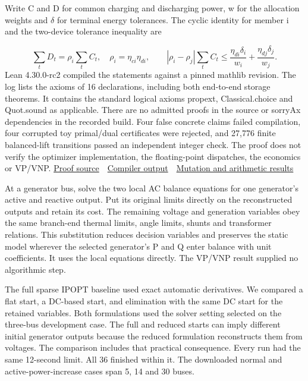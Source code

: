 \documentclass[11pt,letterpaper]{article}
\newcommand{\secname}[1]{\vspace*{2pt}{\LARGE\bfseries\color{accent}#1\par}\vspace{5pt}}
\begin{document}
Write C and D for common charging and discharging power, w for the allocation weights and \ensuremath{\delta} for terminal energy tolerances. The cyclic identity for member i and the two-device tolerance inequality are\par
\[\sum_t D_t=\rho_i\sum_t C_t,\quad \rho_i=\eta_{ci}\eta_{di},\qquad |\rho_i-\rho_j|\sum_t C_t\leq \frac{\eta_{di}\delta_i}{w_i}+\frac{\eta_{dj}\delta_j}{w_j}.\]
Lean 4.30.0-rc2 compiled the statements against a pinned mathlib revision. The log lists the axioms of 16 declarations, including both end-to-end storage theorems. It contains the standard logical axioms propext, Classical.choice and Quot.sound as applicable. There are no admitted proofs in the source or sorryAx dependencies in the recorded build. Four false concrete claims failed compilation, four corrupted toy primal/dual certificates were rejected, and 27,776 finite balanced-lift transitions passed an independent integer check. The proof does not verify the optimizer implementation, the floating-point dispatches, the economics or VP/VNP. \href{https://github.com/nousentllc/VP-VNP-Review/blob/energy-explorations/energy/W03/formal/Storage.lean}{Proof source} \,\textperiodcentered\, \href{https://github.com/nousentllc/VP-VNP-Review/blob/energy-explorations/energy/W03/results/B/lean-build.log}{Compiler output} \,\textperiodcentered\, \href{https://github.com/nousentllc/VP-VNP-Review/blob/energy-explorations/energy/W03/results/B/checks.json}{Mutation and arithmetic results}\par
\clearpage
\secname{W03-C \,\textperiodcentered\, Exact elimination in AC power flow}
At a generator bus, solve the two local AC balance equations for one generator's active and reactive output. Put its original limits directly on the reconstructed outputs and retain its cost. The remaining voltage and generation variables obey the same branch-end thermal limits, angle limits, shunts and transformer relations. This substitution reduces decision variables and preserves the static model wherever the selected generator's P and Q enter balance with unit coefficients. It uses the local equations directly. The VP/VNP result supplied no algorithmic step.\par
The full sparse IPOPT baseline used exact automatic derivatives. We compared a flat start, a DC-based start, and elimination with the same DC start for the retained variables. Both formulations used the solver setting selected on the three-bus development case. The full and reduced starts can imply different initial generator outputs because the reduced formulation reconstructs them from voltages. The comparison includes that practical consequence. Every run had the same 12-second limit. All 36 finished within it. The downloaded normal and active-power-increase cases span 5, 14 and 30 buses.\par
\end{document}
